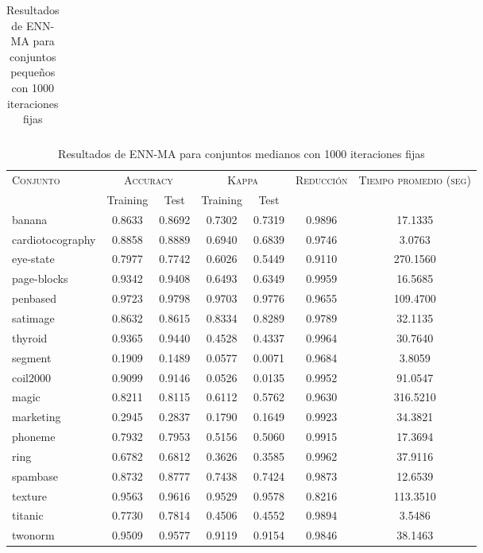\begin{table}[]
\begin{tabular}{l c c c c c c}
\hline
\end{tabular}
\caption{Resultados de ENN-MA para conjuntos pequeños con 1000 iteraciones fijas}
\label{res-peq-ENN-MA}
\end{table}


\begin{table}[]
\centering
\begin{tabular}{l c c c c c c}
\hline
\multirow{2}{*}{\textsc{Conjunto}}
	& \multicolumn{2}{c}{\textsc{Accuracy}}
	& \multicolumn{2}{c}{\textsc{Kappa}}
	& \textsc{Reducción}
	& \textsc{Tiempo promedio (seg)} \\
	& Training & Test
	& Training & Test \\ 
\hline
\hline

banana & 0.8633 & 0.8692 & 0.7302 & 0.7319 & 0.9896 & 17.1335 \\
cardiotocography & 0.8858 & 0.8889 & 0.6940 & 0.6839 & 0.9746 & 3.0763 \\
eye-state & 0.7977 & 0.7742 & 0.6026 & 0.5449 & 0.9110 & 270.1560 \\
page-blocks & 0.9342 & 0.9408 & 0.6493 & 0.6349 & 0.9959 & 16.5685 \\
penbased & 0.9723 & 0.9798 & 0.9703 & 0.9776 & 0.9655 & 109.4700 \\
satimage & 0.8632 & 0.8615 & 0.8334 & 0.8289 & 0.9789 & 32.1135 \\
thyroid & 0.9365 & 0.9440 & 0.4528 & 0.4337 & 0.9964 & 30.7640 \\
segment & 0.1909 & 0.1489 & 0.0577 & 0.0071 & 0.9684 & 3.8059 \\
coil2000 & 0.9099 & 0.9146 & 0.0526 & 0.0135 & 0.9952 & 91.0547 \\
magic & 0.8211 & 0.8115 & 0.6112 & 0.5762 & 0.9630 & 316.5210 \\
marketing & 0.2945 & 0.2837 & 0.1790 & 0.1649 & 0.9923 & 34.3821 \\
phoneme & 0.7932 & 0.7953 & 0.5156 & 0.5060 & 0.9915 & 17.3694 \\
ring & 0.6782 & 0.6812 & 0.3626 & 0.3585 & 0.9962 & 37.9116 \\
spambase & 0.8732 & 0.8777 & 0.7438 & 0.7424 & 0.9873 & 12.6539 \\
texture & 0.9563 & 0.9616 & 0.9529 & 0.9578 & 0.8216 & 113.3510 \\
titanic & 0.7730 & 0.7814 & 0.4506 & 0.4552 & 0.9894 & 3.5486 \\
twonorm & 0.9509 & 0.9577 & 0.9119 & 0.9154 & 0.9846 & 38.1463 \\

\hline
\end{tabular}
\caption{Resultados de ENN-MA para conjuntos medianos con 1000 iteraciones fijas}
\label{res-med-ENN-MA}
\end{table}


